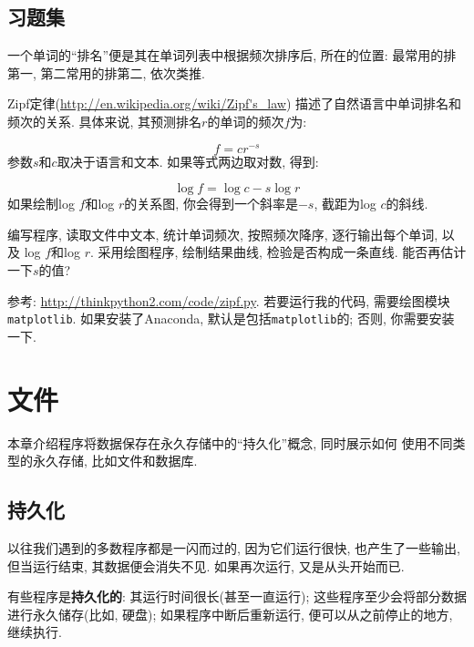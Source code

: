 \documentclass[10pt]{book}
\begin{document}
\section{习题集}

\begin{exercise}

一个单词的``排名''便是其在单词列表中根据频次排序后, 所在的位置:
最常用的排第一, 第二常用的排第二, 依次类推. 

Zipf定律(\url{http://en.wikipedia.org/wiki/Zipf's_law})
描述了自然语言中单词排名和频次的关系. 
具体来说, 其预测排名$r$的单词的频次$f$为:

\[ f = c r^{-s} \]
%
参数$s$和$c$取决于语言和文本. 
如果等式两边取对数, 得到:

\[ \log f = \log c - s \log r \]
%
如果绘制log $f$和log $r$的关系图, 你会得到一个斜率是$-s$, 截距为log $c$的斜线. 

编写程序, 读取文件中文本, 
统计单词频次, 按照频次降序, 逐行输出每个单词, 以及
log $f$和log $r$. 
采用绘图程序, 绘制结果曲线, 检验是否构成一条直线. 
能否再估计一下$s$的值?

参考: \url{http://thinkpython2.com/code/zipf.py}.
若要运行我的代码, 需要绘图模块{\tt matplotlib}.
如果安装了Anaconda, 默认是包括{\tt matplotlib}的;
否则, 你需要安装一下. 

\end{exercise}



\chapter{文件}

本章介绍程序将数据保存在永久存储中的``持久化''概念, 同时展示如何
使用不同类型的永久存储, 比如文件和数据库. 


\section{持久化}

以往我们遇到的多数程序都是一闪而过的, 因为它们运行很快, 也产生了一些输出, 
但当运行结束, 其数据便会消失不见. 
如果再次运行, 又是从头开始而已. 

有些程序是{\bf 持久化的}: 其运行时间很长(甚至一直运行);
这些程序至少会将部分数据进行永久储存(比如, 硬盘);
如果程序中断后重新运行, 便可以从之前停止的地方, 继续执行. 
\end{document}
